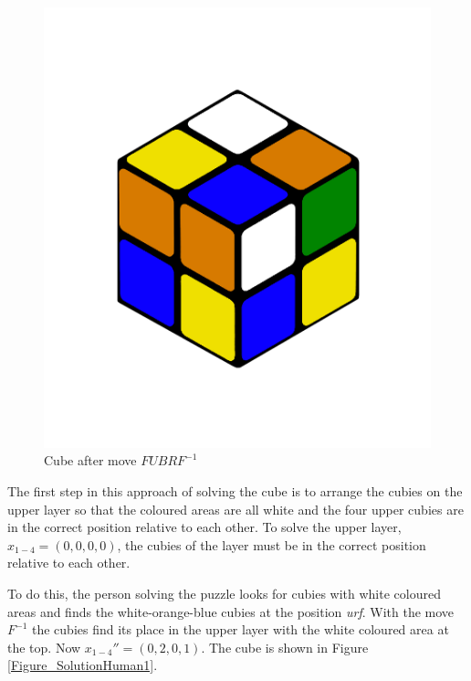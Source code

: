\documentclass[12pt,a4paper]{article}
\theoremstyle{custom}
\begin{document}
\begin{figure}[H]
\centering
\includegraphics[scale=0.13]{LURFL1.png}
\caption{Cube after move $\textit{FUBR}F^{-1}$ }
\label{Figure_SolutionHuman0}
\end{figure}

The first step in this approach of solving the cube is to arrange the cubies on the upper layer so that the coloured areas are all white and the four upper cubies are in the correct position relative to each other.
To solve the upper layer, $x_{1-4} = (0,0,0,0)$,  the cubies of the layer must be in the correct position relative to each other.

To do this, the person solving the puzzle looks for cubies with white coloured areas and finds the white-orange-blue cubies at the position \textit{urf}.
With the move $F^{-1}$ the cubies find its place in the upper layer with the white coloured area at the top.
Now $x_{1-4}''=(0,2,0,1)$. The cube is shown in Figure \ref{Figure_SolutionHuman1}.  
\end{document}
